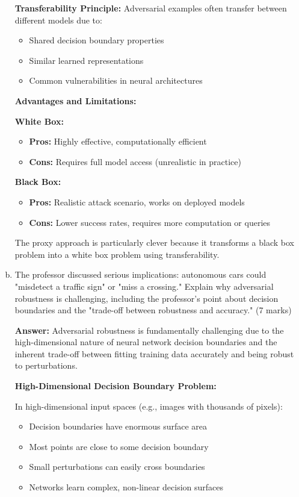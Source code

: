 \documentclass[12pt]{article}
\newcommand{\answer}[1]{{\color{answercolor}\textbf{Answer:} #1}}
\newcommand{\explanation}[1]{{\color{explanationcolor}#1}}
\begin{document}
\begin{enumerate}[(a)]
{    \textbf{Transferability Principle:}
    Adversarial examples often transfer between different models due to:
    \begin{itemize}
        \item Shared decision boundary properties
        \item Similar learned representations
        \item Common vulnerabilities in neural architectures
    \end{itemize}
    
    \textbf{Advantages and Limitations:}
    
    \textbf{White Box:}
    \begin{itemize}
        \item \textbf{Pros:} Highly effective, computationally efficient
        \item \textbf{Cons:} Requires full model access (unrealistic in practice)
    \end{itemize}
    
    \textbf{Black Box:}
    \begin{itemize}
        \item \textbf{Pros:} Realistic attack scenario, works on deployed models
        \item \textbf{Cons:} Lower success rates, requires more computation or queries
    \end{itemize}
    
    The proxy approach is particularly clever because it transforms a black box problem into a white box problem using transferability.
    }
    
    \item The professor discussed serious implications: autonomous cars could "misdetect a traffic sign" or "miss a crossing." Explain why adversarial robustness is challenging, including the professor's point about decision boundaries and the "trade-off between robustness and accuracy." \hfill (7 marks)
    
    \answer{Adversarial robustness is fundamentally challenging due to the high-dimensional nature of neural network decision boundaries and the inherent trade-off between fitting training data accurately and being robust to perturbations.}
    
    \explanation{
    \textbf{High-Dimensional Decision Boundary Problem:}
    
    In high-dimensional input spaces (e.g., images with thousands of pixels):
    \begin{itemize}
        \item Decision boundaries have enormous surface area
        \item Most points are close to some decision boundary
        \item Small perturbations can easily cross boundaries
        \item Networks learn complex, non-linear decision surfaces
    \end{itemize}
    
}
\end{enumerate}
\end{document}
